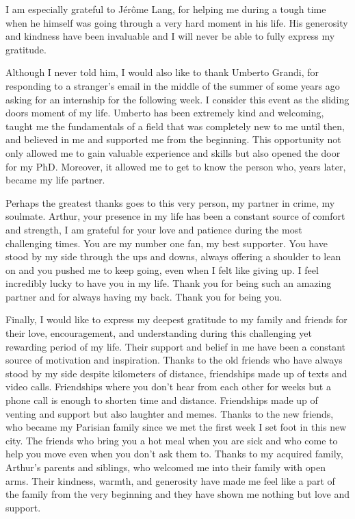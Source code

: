 I am especially grateful to Jérôme Lang, for helping me during a tough time when he himself was going through a very hard moment in his life. His generosity and kindness have been invaluable and I will never be able to fully express my gratitude.

Although I never told him, I would also like to thank Umberto Grandi, for responding to a stranger’s email in the middle of the summer of some years ago asking for an internship for the following week. I consider this event as the sliding doors moment of my life. Umberto has been extremely kind and welcoming, taught me the fundamentals of a field that was completely new to me until then, and believed in me and supported me from the beginning. This opportunity not only allowed me to gain valuable experience and skills but also opened the door for my PhD. Moreover, it allowed me to get to know the person who, years later, became my life partner.

Perhaps the greatest thanks goes to this very person, my partner in crime, my soulmate. Arthur, your   presence in my life has been a constant source of comfort and strength, I am grateful for your love and patience during the most challenging times. You are my number one fan, my best supporter. 
You have stood by my side through the ups and downs, always offering a shoulder to lean on and you pushed me to keep going, even when I felt like giving up. I feel incredibly lucky to have you in my life. Thank you for being such an amazing partner and for always having my back. Thank you for being you.

Finally, I would like to express my deepest gratitude to my family and friends for their love, encouragement, and understanding during this challenging yet rewarding period of my life. Their support and belief in me have been a constant source of motivation and inspiration. Thanks to the old friends who have always stood by my side despite kilometers of distance, friendships made up of texts and video calls. Friendships where you don't hear from each other for weeks but a phone call is enough to shorten time and distance. Friendships made up of venting and support but also laughter and memes. Thanks to the new friends, who became my Parisian family since we met the first week I set foot in this new city. The friends who bring you a hot meal when you are sick and who come to help you move even when you don't ask them to. Thanks to my acquired family, Arthur's parents and siblings, who welcomed me into their family with open arms. Their kindness, warmth, and generosity have made me feel like a part of the family from the very beginning and they have shown me nothing but love and support. 

